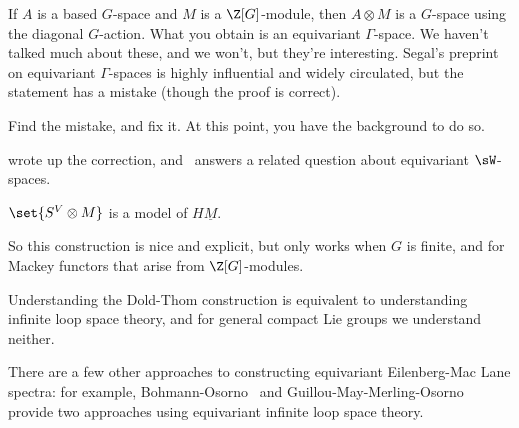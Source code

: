 \begin{cons}
If $A$ is a based $G$-space and $M$ is a $\Z[G]$-module, then $A\otimes M$ is a $G$-space using the diagonal
$G$-action. What you obtain is an equivariant $\Gamma$-space. We haven't talked much about these, and we won't, but
they're interesting. Segal's preprint on equivariant $\Gamma$-spaces \cite{SegalEquivariant} is highly influential
and widely circulated, but the statement has a mistake (though the proof is correct).
\begin{ex}
Find the mistake, and fix it. At this point, you have the background to do so.
\end{ex}
\cite{Shi89} wrote up the correction, and~\cite{BlumbergWSpace} answers a related question about equivariant
$\sW$-spaces.
\begin{thm}
\label{EMmodel}
$\set{S^V\otimes M}$ is a model of $H\underline M$.
\end{thm}
So this construction is nice and explicit, but only works when $G$ is finite, and for Mackey functors that arise
from $\Z[G]$-modules.
\end{cons}
Understanding the Dold-Thom construction is equivalent to understanding infinite loop space theory, and for general
compact Lie groups we understand neither.

There are a few other approaches to constructing equivariant Eilenberg-Mac Lane spectra: for example,
Bohmann-Osorno~\cite[\S8]{BO15} and Guillou-May-Merling-Osorno~\cite[\S6.2]{GMMO17} provide two approaches using
equivariant infinite loop space theory.
